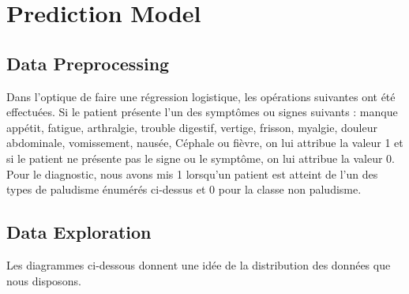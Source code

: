 \section{Prediction Model}\label{prediction_model}
\subsection{Data Preprocessing}
Dans l’optique de faire une régression logistique, les opérations suivantes ont été  effectuées. 
Si le patient présente l’un des symptômes ou signes suivants : manque appétit, fatigue, arthralgie, trouble digestif, vertige, frisson, myalgie, douleur abdominale, vomissement, nausée, Céphale ou fièvre, on lui attribue la valeur 1 et si le patient ne présente pas le signe ou le symptôme, on lui attribue la valeur 0.
 Pour le diagnostic, nous avons mis 1 lorsqu’un patient est atteint de l’un des types de paludisme énumérés ci-dessus et 0 pour la classe non paludisme.
\subsection{Data Exploration}
Les diagrammes ci-dessous donnent une idée de la distribution des données que nous disposons.

